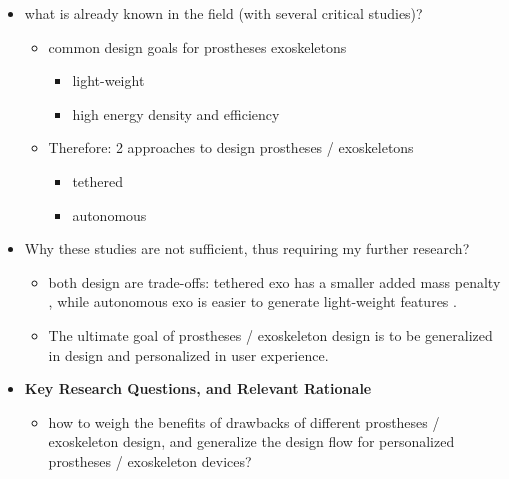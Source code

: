 \documentclass{article}
\begin{document}
\begin{itemize}
    \item what is already known in the field (with several critical studies)?
    
    \begin{itemize}
        \item common design goals for prostheses exoskeletons
        \begin{itemize}
            \item light-weight \cite{ProsthesisOverview}
            \item high energy density and efficiency \cite{OSLSpring}
        \end{itemize}
        \item Therefore: 2 approaches to design prostheses / exoskeletons
        \begin{itemize}
            \item tethered \cite{tetheredExoEg}
            \item autonomous \cite{OSL2020}
        \end{itemize}
    \end{itemize}

    \item Why these studies are not sufficient, thus requiring my further research?
    
    \begin{itemize}
        \item both design are trade-offs: tethered exo has a smaller added mass penalty \cite{tetheredExoBenefits}, while autonomous exo is easier to generate light-weight features \cite{OSLSpring}. 
        \item The ultimate goal of prostheses / exoskeleton design is to be generalized in design and personalized in user experience. 
    \end{itemize}
    
    \item \textbf{Key Research Questions, and Relevant Rationale}
    
    \begin{itemize}
        \item how to weigh the benefits of drawbacks of different prostheses / exoskeleton design, and generalize the design flow for personalized prostheses / exoskeleton devices? 
    \end{itemize}
    

\end{itemize}
\end{document}
